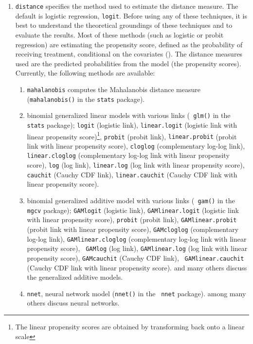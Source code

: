 \documentclass[oneside,letterpaper,titlepage]{article}
\begin{document}
\begin{enumerate}
\item \texttt{distance} specifies the method used to estimate the
  distance measure. The default is logistic regression, {\tt logit}.
  Before using any of these techniques, it is best to understand the
  theoretical groundings of these techniques and to evaluate the
  results.  Most of these methods (such as logistic or probit
  regression) are estimating the propensity score, defined as the
  probability of receiving treatment, conditional on the covariates
  (\cite{RosRub83}).  The distance measures used are the predicted
  probabilities from the model (the propensity scores).  Currently,
  the following methods are available:
  \begin{enumerate}
  \item {\tt mahalanobis} computes the Mahalanobis distance measure
    ({\tt mahalanobis()} in the {\tt stats} package).
  \item binomial generalized linear models with various links ({\tt
      glm()} in the {\tt stats} package); \texttt{logit} (logistic
    link), {\tt linear.logit} (logistic link with linear propensity
    score)\footnote{The linear propensity scores are obtained by
      transforming back onto a linear scale}, \texttt{probit} (probit
    link), {\tt linear.probit} (probit link with linear propensity
    score), {\tt cloglog} (complementary log-log link), {\tt
      linear.cloglog} (complementary log-log link with linear
    propensity score), {\tt log} (log link), {\tt linear.log} (log
    link with linear propensity score), {\tt cauchit} (Cauchy CDF
    link), {\tt linear.cauchit} (Cauchy CDF link with linear
    propensity score).

  \item binomial generalized additive model with various links ({\tt
      gam()} in the {\tt mgcv} package); \texttt{GAMlogit} (logistic
    link), {\tt GAMlinear.logit} (logistic link with linear propensity
    score), \texttt{probit} (probit link), {\tt GAMlinear.probit}
    (probit link with linear propensity score), {\tt GAMcloglog}
    (complementary log-log link), {\tt GAMlinear.cloglog}
    (complementary log-log link with linear propensity score), {\tt
      GAMlog} (log link), {\tt GAMlinear.log} (log link with linear
    propensity score), {\tt GAMcauchit} (Cauchy CDF link), {\tt
      GAMlinear.cauchit} (Cauchy CDF link with linear propensity
    score). \citet{HasTib90,BecJac98} and many others discuss the
    generalized additive models.

  \item \texttt{nnet}, neural network model ({\tt nnet()} in the {\tt
      nnet} package).
    \citet{BecKinZen00,Bishop95,KinZen02,White92,Zeng99} among many
    others discuss neural networks.
  

\end{enumerate}
\end{enumerate}
\end{document}
